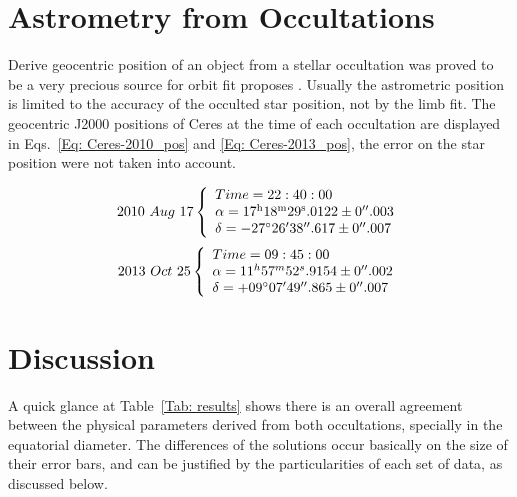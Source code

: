 \documentclass[useAMS,usenatbib]{mn2e}
\begin{document}
\section{Astrometry from Occultations}

Derive geocentric position of an object from a stellar occultation was proved to be a very precious source for orbit fit proposes \citep{Desmars2015}. Usually the astrometric position is limited to the accuracy of the occulted star position, not by the limb fit. The geocentric J2000 positions of Ceres at the time of each occultation are displayed in Eqs.~\ref{Eq: Ceres-2010_pos} and \ref{Eq: Ceres-2013_pos}, the error on the star position were not taken into account.

\begin{equation}
2010 ~ Aug ~ 17
\left\{
 \begin{array}{l l}
    Time = 22:40:00\\
    \alpha = 17^{\text{h}}18^{\text{m}}29^{\text{s}}.0122\pm0\hbox{$^{\prime\prime}$}.003\\
    \delta = -27\hbox{$^\circ$} 26\hbox{$^\prime$} 38\hbox{$^{\prime\prime}$}.617\pm0\hbox{$^{\prime\prime}$}.007
  \end{array}
\right.
\label{Eq: Ceres-2010_pos}
\end{equation}
\begin{equation}
2013 ~ Oct ~ 25
\left\{
  \begin{array}{l l}
    Time = 09:45:00\\
    \alpha = 11^{h}57^{m}52^{s}.9154\pm0\hbox{$^{\prime\prime}$}.002\\
    \delta = +09\hbox{$^\circ$} 07\hbox{$^\prime$} 49\hbox{$^{\prime\prime}$}.865\pm0\hbox{$^{\prime\prime}$}.007
  \end{array}
\right.
\label{Eq: Ceres-2013_pos}
\end{equation}




\section{Discussion}

A quick glance at Table~\ref{Tab: results} shows there is an overall agreement between the physical parameters derived from both occultations, specially in the equatorial diameter. The differences of the solutions occur basically on the size of their error bars, and can be justified by the particularities of each set of data, as discussed below. 
\end{document}
